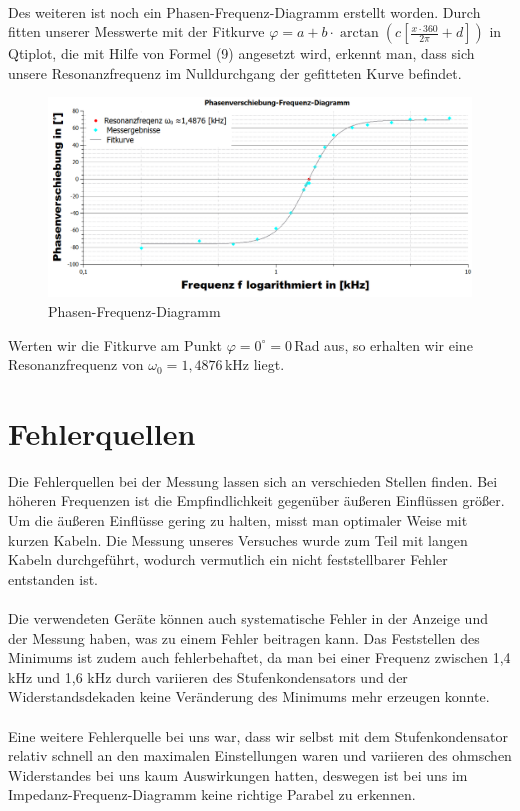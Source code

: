 \documentclass[fontsize=12pt]{scrartcl}
\begin{document}
~\\
Des weiteren ist noch ein Phasen-Frequenz-Diagramm erstellt worden. Durch fitten unserer Messwerte mit der Fitkurve $\varphi = a+ b\cdot\arctan(c[\frac{x\cdot 360}{2\pi} + d])$ in Qtiplot, die mit Hilfe von Formel (9) angesetzt wird, erkennt man, dass sich unsere Resonanzfrequenz im Nulldurchgang der gefitteten Kurve befindet. \\
\newpage
\begin{figure}[h!]
\centering
\includegraphics[scale=0.5]{Graphik/Phase}
\vspace{-10pt}
\caption{Phasen-Frequenz-Diagramm}
\end{figure}
\noindent
Werten wir die Fitkurve am Punkt $\varphi=0^{\circ}=0$\,Rad aus, so erhalten wir eine Resonanzfrequenz von $\omega_0=1,4876$\,kHz liegt. 


\section{Fehlerquellen}

Die Fehlerquellen bei der Messung lassen sich an verschieden Stellen finden. Bei höheren Frequenzen ist die Empfindlichkeit gegenüber äußeren Einflüssen 
größer. Um die äußeren Einflüsse gering zu halten, misst man optimaler Weise mit kurzen Kabeln. Die Messung unseres Versuches wurde zum Teil mit langen 
Kabeln durchgeführt, wodurch vermutlich ein nicht feststellbarer Fehler entstanden ist. \\
~\\
Die verwendeten Geräte können auch systematische Fehler in der Anzeige und der Messung haben, was zu einem Fehler beitragen kann.
Das Feststellen des Minimums ist zudem auch fehlerbehaftet, da man bei einer Frequenz zwischen 1,4 kHz und 1,6 kHz durch variieren des 
Stufenkondensators und der Widerstandsdekaden keine Veränderung des Minimums mehr erzeugen konnte. \\
~\\
Eine weitere Fehlerquelle bei uns war, dass wir selbst mit dem Stufenkondensator relativ schnell an den maximalen Einstellungen waren und variieren des ohmschen Widerstandes bei uns kaum Auswirkungen hatten, deswegen ist bei uns im Impedanz-Frequenz-Diagramm keine richtige Parabel zu erkennen.
\newpage
\end{document}
